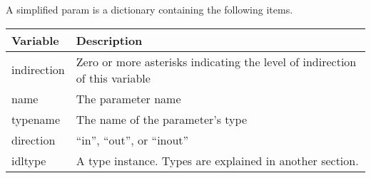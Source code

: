 A simplified param is a dictionary containing the following items.

\begin{tabularx}{\textwidth}{lX}
\textbf{Variable}&\textbf{Description}\\
\hline
indirection&Zero or more asterisks indicating the level of indirection of this variable\\
name&The parameter name\\
typename&The name of the parameter's type\\
direction&``in'', ``out'', or ``inout''\\
idltype&A type instance. Types are explained in another section.\\
\end{tabularx}

